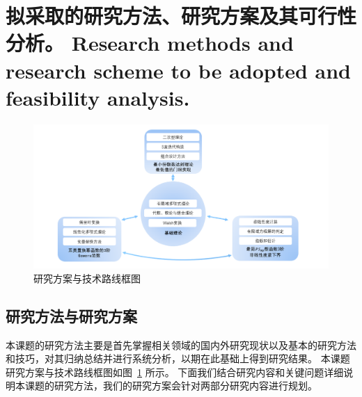 \documentclass[a4paper,zihao=-4,AutoFakeBold]{ctexart}
\begin{document}
\section{拟采取的研究方法、研究方案及其可行性分析。
  Research methods and research scheme to be adopted
  and feasibility analysis.}
\begin{figure}
    \centering
    \includegraphics[width=17cm]{figures/Proposal_pic.png} 
    \caption{研究方案与技术路线框图}
    \label{pic:research_scheme}
\end{figure}
\subsection{研究方法与研究方案}
本课题的研究方法主要是首先掌握相关领域的国内外研究现状以及基本的研究方法和技巧，对其归纳总结并进行系统分析，以期在此基础上得到研究结果。
本课题研究方案与技术路线框图如图~\ref{pic:research_scheme} 所示。
下面我们结合研究内容和关键问题详细说明本课题的研究方法，我们的研究方案会针对两部分研究内容进行规划。
\end{document}
